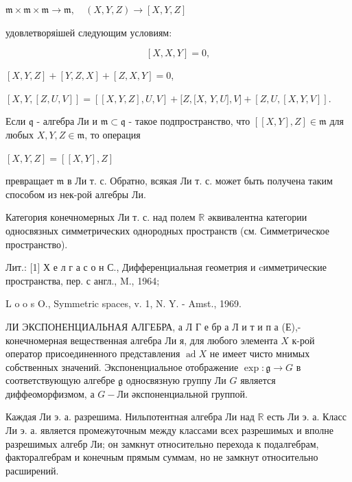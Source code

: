 \documentclass[10pt]{article}
\begin{document}
$\mathfrak{m} \times \mathfrak{m} \times \mathfrak{m} \longrightarrow \mathfrak{m}, \quad(X, Y, Z) \longrightarrow[X, Y, Z]$



удовлетворяішей следующим условиям:



\[

[X, X, Y]=0,

\]



$[X, Y, Z]+[Y, Z, X]+[Z, X, Y]=0$,



$[X, Y,[Z, U, V]]=[[X, Y, Z], U, V]+[Z,[X$, $Y, U], V]+[Z, U,[X, Y, V]]$.



Если $\mathfrak{q}$ - алгебра Ли и $\mathfrak{m} \subset \mathfrak{q}$ - такое подпространство, что $[[X, Y], Z] \in \mathfrak{m}$ для любых $X, Y, Z \in \mathfrak{m}$, то операция



$[X, Y, Z]=[[X, Y], Z]$



превращает $\mathfrak{m}$ в Ли т. с. Обратно, всякая Ли т. с. может быть получена таким способом из нек-рой алгебры Ли.



Категория конечномерных Ли т. с. над полем $\mathbb{R}$ әквивалентна категории односвязных симметрических однородных пространств (см. Симметрическое пространство).



Лит.: [1] Х е л г а с о н С., Дифференциальная геометрия и cимметрические пространства, пер. с англ., M., 1964;

L o o s O., Symmetric spaces, v. 1, N. Y. - Amst., 1969.



ЛИ ЭКСПОНЕНЦИАЛЬНАЯ АЛГЕБРА, а Л Г е бр а Л и т и п а (Е),- конечномерная вещественная алгебра Ли я, для любого элемента $X$ к-рой оператор присоединенного представления $\operatorname{ad} X$ не имеет чисто мнимых собственных значений. Экспоненциальное отображение $\exp : \mathfrak{g} \rightarrow G$ в соответствующую алгебре $\mathfrak{g}$ односвязную группу Ли $G$ является диффеоморфизмом, а $G-Л и$ әкспоненциальной группой.



Каждая Ли э. а. разрешима. Нильпотентная алгебра Ли над $\mathbb{R}$ есть Ли э. а. Класс Ли э. а. является промежуточным между классами всех разрешимых и вполне разрешимых алгебр Ли; он замкнут относительно перехода к подалгебрам, факторалгебрам и конечным прямым суммам, но не замкнут относительно расширений.
\end{document}
